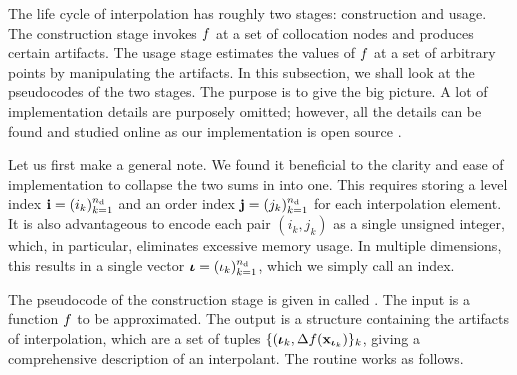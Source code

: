 
The life cycle of interpolation has roughly two stages: construction and usage.
The construction stage invokes $f$ at a set of collocation nodes and produces
certain artifacts. The usage stage estimates the values of $f$ at a set of
arbitrary points by manipulating the artifacts. In this subsection, we shall
look at the pseudocodes of the two stages. The purpose is to give the big
picture. A lot of implementation details are purposely omitted; however, all the
details can be found and studied online as our implementation is open source
\cite{sources}.

Let us first make a general note. We found it beneficial to the clarity and ease
of implementation to collapse the two sums in  into one.
This requires storing a level index $\mathbf{i} = (i_k)_{k = 1}^{n_\text{d}}$ and an order
index $\mathbf{j} = (j_k)_{k = 1}^{n_\text{d}}$ for each interpolation element. It is also
advantageous to encode each pair $(i_k, j_k)$ as a single unsigned integer,
which, in particular, eliminates excessive memory usage. In multiple dimensions,
this results in a single vector ${\bm{\iota}} = (\iota_k)_{k = 1}^{n_\text{d}}$, which we simply
call an index. 

The pseudocode of the construction stage is given in  called
. The  input is a function $f$ to be
approximated. The  output is a structure containing the
artifacts of interpolation, which are a set of tuples $\{ ({\bm{\iota}}_k,
\Delta f(\mathbf{x}_{{\bm{\iota}}_k}) \}_k$, giving a comprehensive description of an
interpolant. The routine works as follows.

